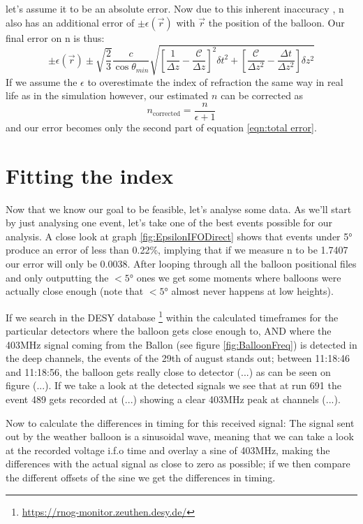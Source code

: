 \documentclass[11pt,a4paper,faculty=we,language=en,doctype=report]{cls/ugent-doc}
\begin{document}
let's assume it to be an absolute error.  Now due to this inherent inaccuracy ,
n also has an additional error of $\pm \epsilon(\vec{r})$ with $\vec{r}$ the
position of the balloon. Our final error on n is thus:
\begin{equation}
  \pm \epsilon(\vec{r})\pm\sqrt{\frac{2}{3}}\frac{c}{\cos{\theta_{min}}}\sqrt{\left[\frac{1}{\Delta z} - \frac{\mathcal{C}}{\Delta z}\right]^2\delta t^2 + 
      \left[\frac{\mathcal{C}}{\Delta z^2} - \frac{\Delta t}{\Delta z^2}\right]\delta z^2}
      \label{eqn:total error}
\end{equation}
If we assume the $\epsilon$ to overestimate the index of refraction the same way in real
life as in the simulation however, our estimated $n$ can be corrected as
\begin{equation}
  n_{\text{corrected}} = \frac{n}{\epsilon + 1}
\end{equation}
and our error becomes only the second part of equation \ref{eqn:total error}.
\newpage
\section{Fitting the index}
Now that we know our goal to be feasible, let's analyse some data.  As we'll
start by just analysing one event, let's take one of the best events possible
for our analysis.  A close look at graph \ref{fig:EpsilonIFODirect} shows that
events under 5° produce an error of less than 0.22\%, implying that if we
measure n to be 1.7407 our error will only be 0.0038. After looping through all
the balloon positional files and only outputting the $<5°$ ones we get some
moments where balloons were actually close enough (note that $<5°$ almost never
happens at low heights).

If we search in the DESY database
\footnote{\url{https://rnog-monitor.zeuthen.desy.de/}} within the calculated
timeframes for the particular detectors where the balloon gets close enough to,
AND where the 403MHz signal coming from the Ballon (see figure
\ref{fig:BalloonFreq}) is detected in the deep channels, the events of the 29th
of august stands out; between 11:18:46 and 11:18:56, the balloon gets really
close to detector (...) as can be seen on figure (...). If we take a look
at the detected signals we see that at run 691 the event 489 gets recorded at
(...) showing a clear 403MHz peak at channels (...).

Now to calculate the differences in timing for this received signal:  The
signal sent out by the weather balloon is a sinusoidal wave, meaning that we
can take a look at the recorded voltage i.f.o time and overlay a sine of
403MHz, making the differences with the actual signal as close to zero as
possible; if we then compare the different offsets of the sine we get the
differences in timing.
\end{document}
